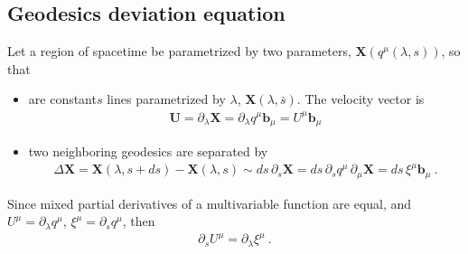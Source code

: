 \documentclass[letterpaper,10pt,english]{jupyterBook}
\begin{document}
\subsection{Geodesics deviation equation}
\label{\detokenize{ch/relativity-general/geodesics:geodesics-deviation-equation}}\label{\detokenize{ch/relativity-general/geodesics:general-relativity-geodesics-deviation}}
\sphinxAtStartPar
Let a region of spacetime be parametrized by two parameters, \(\mathbf{X}\left( q^{\mu}(\lambda, s) \right)\), so that
\begin{itemize}
\item {} 
\sphinxAtStartPar
{} are constant\sphinxhyphen{}\(s\) lines parametrized by \(\lambda\), \(\mathbf{X}(\lambda, \bar{s})\). The velocity vector is
\begin{equation*}
\begin{split}\mathbf{U} = \partial_{\lambda} \mathbf{X} = \partial_{\lambda} q^{\mu} \mathbf{b}_{\mu} = U^{\mu} \mathbf{b}_{\mu}\end{split}
\end{equation*}
\item {} 
\sphinxAtStartPar
two neighboring geodesics are separated by
\begin{equation*}
\begin{split}\Delta \mathbf{X} = \mathbf{X}(\lambda, s+ds) - \mathbf{X}(\lambda, s) \sim ds \, \partial_s \mathbf{X} = ds \, \partial_s q^{\mu} \, \partial_{\mu} \mathbf{X} = ds \, \xi^{\mu} \mathbf{b}_{\mu} \ .\end{split}
\end{equation*}
\end{itemize}

\sphinxAtStartPar
Since mixed partial derivatives of a multi\sphinxhyphen{}variable function are equal, and \(U^{\mu} = \partial_{\lambda} q^{\mu}\), \(\xi^{\mu} = \partial_s q^{\mu}\), then
\begin{equation*}
\begin{split}\partial_s U^{\mu} = \partial_\lambda \xi^{\mu} \ .\end{split}
\end{equation*}
\end{document}
